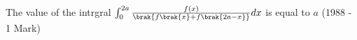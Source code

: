 \iffalse	
\title{Assignment}
\author{Bheri Sai Likith Reddy}
\section{true-false}
\fi
\item The value of the intrgral $\int_0^{2a} \frac{f(x)}{\brak{f\brak{x}+f\brak{2a-x}}}dx$ is equal to $a$
\hfill{(1988 - 1 Mark)}\\
